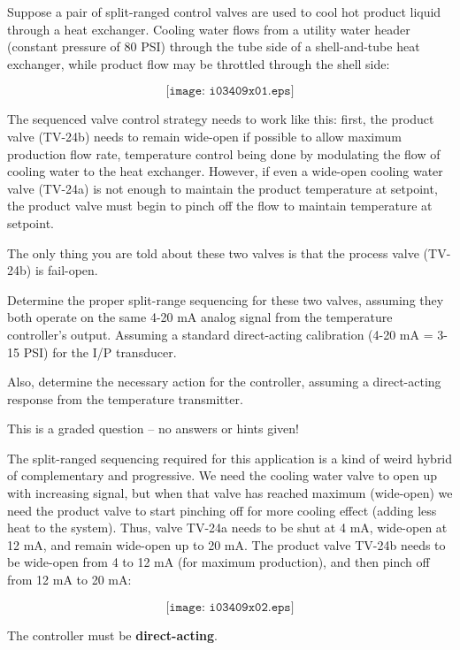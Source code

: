 

Suppose a pair of split-ranged control valves are used to cool hot product liquid through a heat exchanger.  Cooling water flows from a utility water header (constant pressure of 80 PSI) through the tube side of a shell-and-tube heat exchanger, while product flow may be throttled through the shell side:

$$\texttt{[image: i03409x01.eps]}$$

The sequenced valve control strategy needs to work like this: first, the product valve (TV-24b) needs to remain wide-open if possible to allow maximum production flow rate, temperature control being done by modulating the flow of cooling water to the heat exchanger.  However, if even a wide-open cooling water valve (TV-24a) is not enough to maintain the product temperature at setpoint, the product valve must begin to pinch off the flow to maintain temperature at setpoint.

The only thing you are told about these two valves is that the process valve (TV-24b) is fail-open.

\vskip 10pt

Determine the proper split-range sequencing for these two valves, assuming they both operate on the same 4-20 mA analog signal from the temperature controller's output.  Assuming a standard direct-acting calibration (4-20 mA = 3-15 PSI) for the I/P transducer.  

\vskip 10pt

Also, determine the necessary action for the controller, assuming a direct-acting response from the temperature transmitter.

\vfil 

\eject






This is a graded question -- no answers or hints given!







The split-ranged sequencing required for this application is a kind of weird hybrid of complementary and progressive.  We need the cooling water valve to open up with increasing signal, but when that valve has reached maximum (wide-open) we need the product valve to start pinching off for more cooling effect (adding less heat to the system).  Thus, valve TV-24a needs to be shut at 4 mA, wide-open at 12 mA, and remain wide-open up to 20 mA.  The product valve TV-24b needs to be wide-open from 4 to 12 mA (for maximum production), and then pinch off from 12 mA to 20 mA:

$$\texttt{[image: i03409x02.eps]}$$

The controller must be {\bf direct-acting}.




